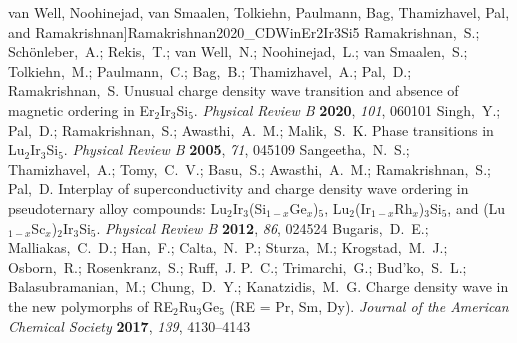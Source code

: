 \documentclass[journal=cmatex,manuscript=article]{achemso}
\begin{document}
\begin{mcitethebibliography}{73}
	van Well, Noohinejad, van Smaalen, Tolkiehn, Paulmann, Bag, Thamizhavel, Pal,
	and Ramakrishnan]{Ramakrishnan2020_CDWinEr2Ir3Si5}
	Ramakrishnan,~S.; Sch\"onleber,~A.; Rekis,~T.; van Well,~N.; Noohinejad,~L.;
	van Smaalen,~S.; Tolkiehn,~M.; Paulmann,~C.; Bag,~B.; Thamizhavel,~A.;
	Pal,~D.; Ramakrishnan,~S. Unusual charge density wave transition and absence
	of magnetic ordering in {Er}$_2${Ir}$_3${Si}$_5$. \emph{Physical Review B}
	\textbf{2020}, \emph{101}, 060101\relax
	\mciteBstWouldAddEndPuncttrue
	\mciteSetBstMidEndSepPunct{\mcitedefaultmidpunct}
	{\mcitedefaultendpunct}{\mcitedefaultseppunct}\relax
	\EndOfBibitem
	Singh,~Y.; Pal,~D.; Ramakrishnan,~S.; Awasthi,~A.~M.; Malik,~S.~K. Phase
	transitions in {Lu}$_2${Ir}$_3${Si}$_5$. \emph{Physical Review B}
	\textbf{2005}, \emph{71}, 045109\relax
	\mciteBstWouldAddEndPuncttrue
	\mciteSetBstMidEndSepPunct{\mcitedefaultmidpunct}
	{\mcitedefaultendpunct}{\mcitedefaultseppunct}\relax
	\EndOfBibitem
	Sangeetha,~N.~S.; Thamizhavel,~A.; Tomy,~C.~V.; Basu,~S.; Awasthi,~A.~M.;
	Ramakrishnan,~S.; Pal,~D. Interplay of superconductivity and charge density
	wave ordering in pseudoternary alloy compounds:
	{Lu}$_2${Ir}$_3$({Si}$_{1-x}${Ge}$_x$)$_5$,
	{Lu}$_2$({Ir}$_{1-x}${Rh}$_x$)$_3${Si}$_5$, and
	({Lu}$_{1-x}${Sc}$_x$)$_2${Ir}$_3${Si}$_5$. \emph{Physical Review B}
	\textbf{2012}, \emph{86}, 024524\relax
	\mciteBstWouldAddEndPuncttrue
	\mciteSetBstMidEndSepPunct{\mcitedefaultmidpunct}
	{\mcitedefaultendpunct}{\mcitedefaultseppunct}\relax
	\EndOfBibitem
	Bugaris,~D.~E.; Malliakas,~C.~D.; Han,~F.; Calta,~N.~P.; Sturza,~M.;
	Krogstad,~M.~J.; Osborn,~R.; Rosenkranz,~S.; Ruff,~J. P.~C.; Trimarchi,~G.;
	Bud'ko,~S.~L.; Balasubramanian,~M.; Chung,~D.~Y.; Kanatzidis,~M.~G. Charge
	density wave in the new polymorphs of {RE}$_2${Ru}$_3${Ge}$_5$ ({RE} = {Pr},
	{Sm}, {Dy}). \emph{Journal of the American Chemical Society} \textbf{2017},
	\emph{139}, 4130--4143\relax
	\mciteBstWouldAddEndPuncttrue
	\mciteSetBstMidEndSepPunct{\mcitedefaultmidpunct}
	{\mcitedefaultendpunct}{\mcitedefaultseppunct}\relax
	\EndOfBibitem

\end{mcitethebibliography}
\end{document}
